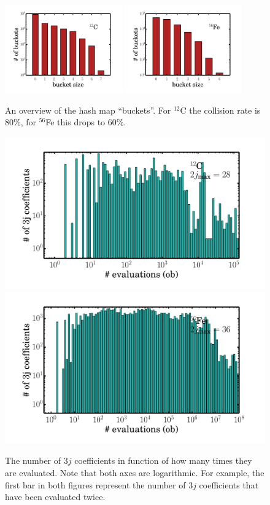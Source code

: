 \documentclass[10pt]{article}
\begin{document}
\begin{figure}
\centering
\includegraphics[width=0.45\textwidth]{figures/threej_map_buckets_12C.pdf}
\includegraphics[width=0.45\textwidth]{figures/threej_map_buckets_56Fe.pdf}
\caption{An overview of the hash map ``buckets''. For $^{12}$C the collision rate is $80\%$, for $^{56}$Fe this drops to  $60\%$.}
\end{figure}

\begin{figure}
\centering
\includegraphics[width=\textwidth]{figures/threej_evals_12C.pdf}
\includegraphics[width=\textwidth]{figures/threej_evals_56Fe.pdf}
\caption{The number of $3j$ coefficients in function of how many times they are evaluated. Note that both axes are logarithmic. For example, the first bar in both figures represent the number of $3j$ coefficients that have been evaluated twice.}
\end{figure}
\end{document}
